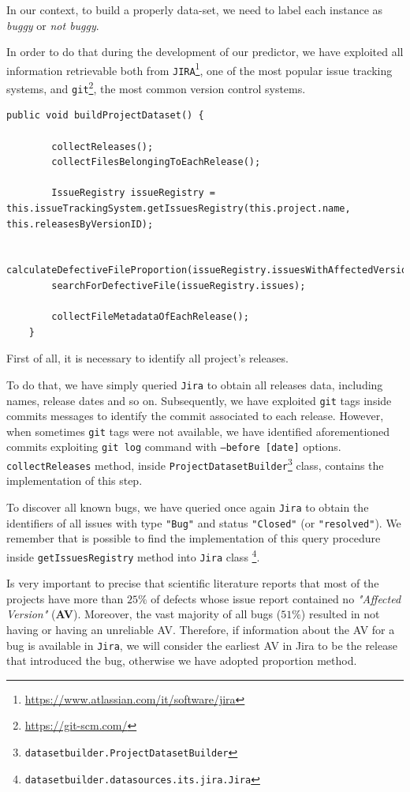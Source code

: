 \documentclass[sigconf]{acmart}
\begin{document}
In our context, to build a properly data-set, we need to label each instance as \textit{buggy} or \textit{not buggy}. 

In order to do that during the development of our predictor, we have exploited all information retrievable both from \texttt{JIRA}\footnote{\url{https://www.atlassian.com/it/software/jira}}, one of the most popular issue tracking systems, and \texttt{git}\footnote{\url{https://git-scm.com/}}, the most common version control systems.

\begin{lstlisting}[frame=lines,basicstyle=\ttfamily\tiny, caption={Dataset build logic}, label={buildProjectDataset}]
public void buildProjectDataset() {

        collectReleases();
        collectFilesBelongingToEachRelease();

        IssueRegistry issueRegistry = this.issueTrackingSystem.getIssuesRegistry(this.project.name, this.releasesByVersionID);

        calculateDefectiveFileProportion(issueRegistry.issuesWithAffectedVersions);
        searchForDefectiveFile(issueRegistry.issues);

        collectFileMetadataOfEachRelease();
    }
\end{lstlisting}

First of all, it is necessary to identify all project's releases.

To do that, we have simply queried \texttt{Jira} to obtain all releases data, including names, release dates and so on. Subsequently, we have exploited \texttt{git} tags inside commits messages to identify the commit associated to each release. However, when sometimes \texttt{git} tags were not available, we have identified aforementioned commits exploiting \texttt{git log} command with \texttt{--before [date]} options. \texttt{collectReleases} method, inside \texttt{ProjectDatasetBuilder}\footnote{\texttt{datasetbuilder.ProjectDatasetBuilder}} class, contains the implementation of this step.

To discover all known bugs, we have queried once again \texttt{Jira} to obtain the identifiers of all issues with type \texttt{"Bug"} and status \texttt{"Closed"} (or \texttt{"resolved"}). We remember that is possible to find the implementation of this query procedure inside \texttt{getIssuesRegistry} method into \texttt{Jira} class \footnote{\texttt{datasetbuilder.datasources.its.jira.Jira}}.

Is very important to precise that scientific literature reports that most of the projects have more than $25\%$ of defects whose issue report contained no \textit{"Affected Version"} (\textbf{AV}). Moreover, the vast majority of all bugs ($51\%$) resulted in not having or having an unreliable AV. Therefore, if information about the AV for a bug is available in \texttt{Jira}, we will consider the earliest AV in Jira to be the release that introduced the bug, otherwise we have adopted proportion method.
\end{document}
